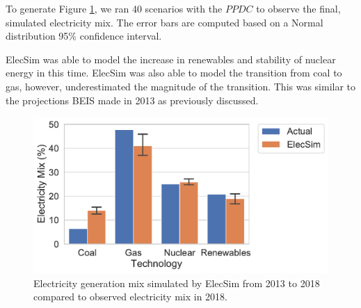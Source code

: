 To generate Figure \ref{fig:uk_validated_results_2018}, we ran 40 scenarios with the $PPDC$ to observe the final, simulated electricity mix. The error bars are computed based on a Normal distribution 95\% confidence interval.

ElecSim was able to model the increase in renewables and stability of nuclear energy in this time. ElecSim was also able to model the transition from coal to gas, however, underestimated the magnitude of the transition. This was similar to the projections BEIS made in 2013 as previously discussed.

\begin{figure}
	\centering
	\includegraphics[width=\textwidth]{Chapter4/figures/e-Energy-2020/results/best_run_coal_dropout_95_ci.pdf}
	\caption{Electricity generation mix simulated by ElecSim from 2013 to 2018 compared to observed electricity mix in 2018.}
	\label{fig:uk_validated_results_2018}
\end{figure}








